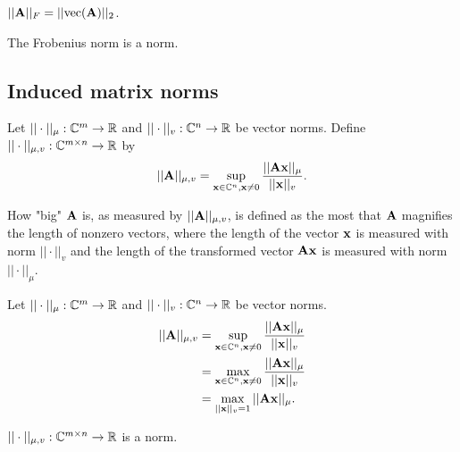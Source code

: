 \begin{remark}
    $||\bold{A}||_F=||\text{vec}(\bold{A})||_2$.
\end{remark}

\begin{proposition}{}{}
    The Frobenius norm is a norm.
\end{proposition}

\subsection{Induced matrix norms}
\begin{definition}{}{}
    Let $||\cdot||_{\mu}:\mathbb{C}^m\rightarrow \mathbb{R}$ and $||\cdot||_{v}:\mathbb{C}^n\rightarrow \mathbb{R}$ be vector norms.
    Define $||\cdot||_{\mu,v}:\mathbb{C}^{m\times n}\rightarrow \mathbb{R}$ by 
    \begin{align*}
        ||\bold{A}||_{\mu,v}=\sup_{\bold{x}\in\mathbb{C}^n,\bold{x}\neq 0}\frac{||\bold{A\bold{x}}||_{\mu}}{||\bold{x}||_v}.
    \end{align*}
\end{definition}

\begin{remark}
    How "big" $\bold{A}$ is, as measured by $||\bold{A}||_{\mu,v}$, 
    is defined as the most that $\bold{A}$ magnifies the length of nonzero vectors,
    where the length of the vector $\bold{x}$ is measured with norm $||\cdot||_v$ and
    the length of the transformed vector $\bold{A}\bold{x}$ is measured with norm $||\cdot||_{\mu}$.
\end{remark}

\begin{proposition}{}{}
    Let $||\cdot||_{\mu}:\mathbb{C}^m\rightarrow \mathbb{R}$ and $||\cdot||_{v}:\mathbb{C}^n\rightarrow \mathbb{R}$ be vector norms.
    \begin{align*}
        ||\bold{A}||_{\mu,v}&=\sup_{\bold{x}\in\mathbb{C}^n,\bold{x}\neq 0}\frac{||\bold{A\bold{x}}||_{\mu}}{||\bold{x}||_v}\\
                            &=\max_{\bold{x}\in\mathbb{C}^n,\bold{x}\neq 0}\frac{||\bold{A\bold{x}}||_{\mu}}{||\bold{x}||_v}\\
                            &=\max_{||\bold{x}||_v=1}||\bold{A}\bold{x}||_{\mu}.
    \end{align*}
\end{proposition}

\begin{proposition}{}{}
    $||\cdot||_{\mu,v}:\mathbb{C}^{m\times n}\rightarrow \mathbb{R}$ is a norm. 
\end{proposition}

